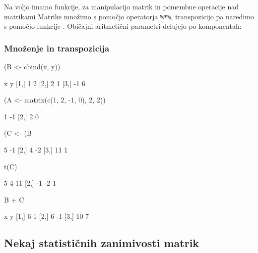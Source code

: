 Na voljo imamo funkcije, za manipulacijo matrik in pomembne operacije nad matrikami
Matrike množimo s pomočjo operatorja \verb"%*%",
transpozicijo pa naredimo s pomočjo funkcije . Običajni
aritmetični parametri delujejo  po komponentah:

\begin{frame}[fragile]
\frametitle{Množenje \code{\%*\%} in transpozicija }
\begin{Schunk}
\begin{Sinput}
 (B <- cbind(x, y))
\end{Sinput}
\begin{Soutput}
      x y
[1,]  1 2
[2,]  2 1
[3,] -1 6
\end{Soutput}
\begin{Sinput}
 (A <- matrix(c(1, 2, -1, 0), 2, 2))
\end{Sinput}
\begin{Soutput}
     [,1] [,2]
[1,]    1   -1
[2,]    2    0
\end{Soutput}
\begin{Sinput}
 (C <- (B %*% A))
\end{Sinput}
\begin{Soutput}
     [,1] [,2]
[1,]    5   -1
[2,]    4   -2
[3,]   11    1
\end{Soutput}
\begin{Sinput}
 t(C)
\end{Sinput}
\begin{Soutput}
     [,1] [,2] [,3]
[1,]    5    4   11
[2,]   -1   -2    1
\end{Soutput}
\begin{Sinput}
 B + C
\end{Sinput}
\begin{Soutput}
      x  y
[1,]  6  1
[2,]  6 -1
[3,] 10  7
\end{Soutput}
\end{Schunk}
\end{frame}

\subsection{Nekaj statističnih zanimivosti matrik}

